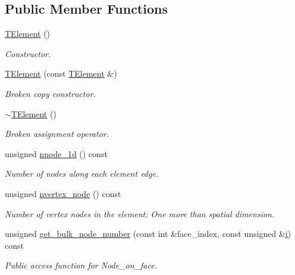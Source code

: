 \subsection*{Public Member Functions}
\begin{DoxyCompactItemize}
\item 
\hyperlink{classoomph_1_1TElement_3_013_00_01NNODE__1D_01_4_ad8704d7f13bc2d0bdb3ca60b1f51002c}{T\+Element} ()
\begin{DoxyCompactList}\small\item\em Constructor. \end{DoxyCompactList}\item 
\hyperlink{classoomph_1_1TElement_3_013_00_01NNODE__1D_01_4_a50e8f2d6857fdfcfc8dc31513b7ffbf4}{T\+Element} (const \hyperlink{classoomph_1_1TElement}{T\+Element} \&)
\begin{DoxyCompactList}\small\item\em Broken copy constructor. \end{DoxyCompactList}\item 
\hyperlink{classoomph_1_1TElement_3_013_00_01NNODE__1D_01_4_a5f93e6aeeedcca1a15d1b3972525ffda}{$\sim$\+T\+Element} ()
\begin{DoxyCompactList}\small\item\em Broken assignment operator. \end{DoxyCompactList}\item 
unsigned \hyperlink{classoomph_1_1TElement_3_013_00_01NNODE__1D_01_4_a28542ccab4d95227085de22683238696}{nnode\+\_\+1d} () const
\begin{DoxyCompactList}\small\item\em Number of nodes along each element edge. \end{DoxyCompactList}\item 
unsigned \hyperlink{classoomph_1_1TElement_3_013_00_01NNODE__1D_01_4_a9b9749d839ef049c508be889fec96a83}{nvertex\+\_\+node} () const
\begin{DoxyCompactList}\small\item\em Number of vertex nodes in the element\+: One more than spatial dimension. \end{DoxyCompactList}\item 
unsigned \hyperlink{classoomph_1_1TElement_3_013_00_01NNODE__1D_01_4_a0963eb2707a18c7b9aeb46338a0cb2ea}{get\+\_\+bulk\+\_\+node\+\_\+number} (const int \&face\+\_\+index, const unsigned \&\hyperlink{cfortran_8h_adb50e893b86b3e55e751a42eab3cba82}{i}) const
\begin{DoxyCompactList}\small\item\em Public access function for Node\+\_\+on\+\_\+face. \end{DoxyCompactList}\item 

\end{DoxyCompactItemize}
